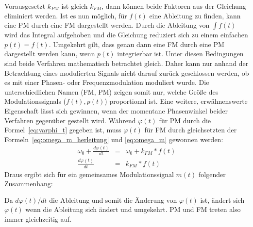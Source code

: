 Vorausgesetzt \(k_{PM}\) ist gleich \(k_{FM}\), dann können beide Faktoren aus der Gleichung eliminiert werden. Ist es nun möglich, für \(f(t)\) eine Ableitung zu finden, kann eine PM durch eine FM dargestellt werden. Durch die Ableitung von \(\int{f(t)}\) wird das Integral aufgehoben und die Gleichung reduziert sich zu einem einfachen \(p(t)=f(t)\). Umgekehrt gilt, dass genau dann eine FM durch eine PM dargestellt werden kann, wenn \(p(t)\) integrierbar ist. Unter diesen Bedingungen sind beide Verfahren mathematisch betrachtet gleich. Daher kann nur anhand der Betrachtung eines modulierten Signals nicht darauf zurück geschlossen werden, ob es mit einer Phasen- oder Frequenzmodulation moduliert wurde. Die unterschiedlichen Namen (FM, PM) zeigen somit nur, welche Größe des Modulationssignals (\(f(t), p(t)\)) proportional ist. \cite[S. 210]{lathi}
Eine weitere, erwähnenswerte Eigenschaft lässt sich gewinnen, wenn der momentane Phasenwinkel beider Verfahren gegenüber gestellt wird. Während \(\varphi(t)\) für PM durch die Formel~\ref{eq:varphi_t} gegeben ist, muss \(\varphi(t)\) für FM durch gleichsetzten der Formeln~\ref{eq:omega_m_herleitung} und \ref{eq:omega_m} gewonnen werden:
\begin{eqnarray*}
\omega_0+\frac{d\varphi(t)}{dt}&=&\omega_0+k_{FM}*f(t) \\
\frac{d\varphi(t)}{dt}&=&k_{FM}*f(t)
\end{eqnarray*}
Draus ergibt sich für ein gemeinsames Modulationssignal \(m(t)\) folgender Zusammenhang:
\begin{center}
\end{center}
Da \({d\varphi(t)}/{dt}\) die Ableitung und somit die Änderung von \(\varphi(t)\) ist, ändert sich \(\varphi(t)\) wenn die Ableitung sich ändert und umgekehrt. PM und FM treten also immer gleichzeitig auf.

